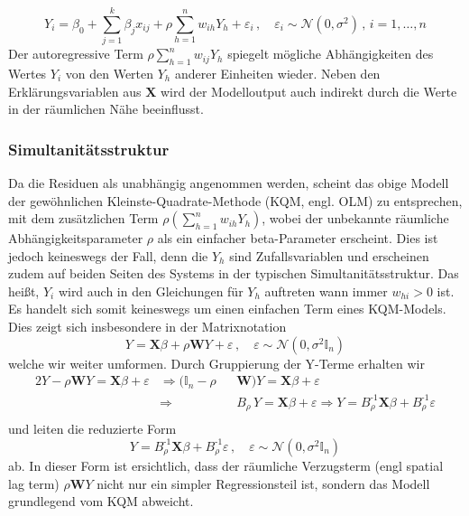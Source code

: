 \begin{equation} \label{eq-6.9:slm-mod}
    Y_i = \beta_{0} + \sum_{j=1}^{k} 
    \beta_{j} x_{ij} + \rho \sum_{h=1}^{n} w_{ih}Y_{h} + \varepsilon_{i} \, , \quad
    \varepsilon_{i} \sim \mathcal{N}(0,\sigma^{2}) \, , \, i=1,\ldots,n
\end{equation}
Der autoregressive Term $\rho \sum_{h=1}^{n} w_{ij} Y_{h}$ spiegelt mögliche 
Abhängigkeiten des Wertes $Y_{i}$ von den Werten $Y_{h}$ anderer Einheiten wieder. 
Neben den Erklärungsvariablen aus $\mathbf{X}$ wird der Modelloutput auch indirekt durch die
Werte in der räumlichen Nähe beeinflusst.

\subsubsection{Simultanitätsstruktur}

Da die Residuen als unabhängig angenommen werden, scheint das obige Modell der 
gewöhnlichen Kleinste-Quadrate-Methode (KQM, engl. OLM) zu entsprechen, mit dem zusätzlichen 
Term $\rho (\sum_{h=1}^{n} w_{ih} Y_{h})$, wobei der unbekannte räumliche Abhängigkeitsparameter $\rho$ 
als ein einfacher beta-Parameter erscheint. Dies ist jedoch keineswegs der Fall, denn die $Y_{h}$ sind
Zufallsvariablen und erscheinen zudem auf beiden Seiten des Systems in der typischen \glqq Simultanitätsstruktur\grqq.
Das heißt, $Y_{i}$ wird auch in den Gleichungen für $Y_{h}$ auftreten wann immer $w_{hi}>0$ ist. Es handelt 
sich somit keineswegs um einen einfachen Term eines KQM-Models. Dies zeigt sich insbesondere in der 
Matrixnotation
\begin{equation*}
    Y=\mathbf{X} \beta +\rho \mathbf{W} Y + \varepsilon \, , \quad 
    \varepsilon \sim \mathcal{N}(0,\sigma^{2} \mathds{I}_{n})
\end{equation*}
welche wir weiter umformen.
Durch Gruppierung der Y-Terme erhalten wir
\begin{alignat*}{2}
    Y - \rho \mathbf{W} Y = \mathbf{X} \beta + \varepsilon & \Rightarrow (\mathds{I}_{n}-\rho && \mathbf{W})Y =\mathbf{X} \beta+\varepsilon \\
                                    & \Rightarrow && B_{\rho} \, Y = \mathbf{X} \beta + \varepsilon  \Rightarrow Y= B_{\rho}^{\text{-1}} \mathbf{X} \beta + B_{\rho}^{\text{-1}} \varepsilon \\
\end{alignat*}
und leiten die reduzierte Form
\begin{equation} \label{eq-6.10:slm-mod-red}
    Y=B_{\rho}^{\text{-1}} \mathbf{X} \beta + B_{\rho}^{\text{-1}} \varepsilon \, , \quad 
    \varepsilon \sim \mathcal{N}(0,\sigma^{2} \mathds{I}_{n})
\end{equation}
ab. In dieser Form ist ersichtlich, dass der räumliche Verzugsterm (engl spatial lag term) $\rho \mathbf{W} Y$ 
nicht nur ein simpler Regressionsteil ist, sondern das Modell grundlegend vom KQM abweicht.\\

